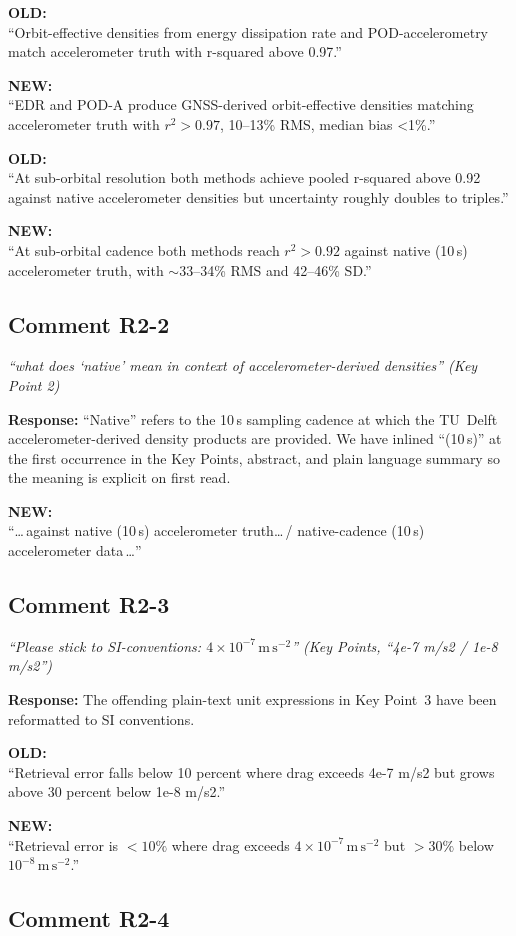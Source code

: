 \documentclass[11pt]{article}
\newcommand{\reviewercomment}[1]{%
  \medskip
  \noindent\textit{\color{reviewblue}#1}%
  \medskip
}
\newcommand{\oldtext}[1]{%
  \smallskip
  \noindent\hspace{1em}\begin{minipage}{0.92\textwidth}%
  \color{quotegray}\textbf{OLD:}\\[2pt]``#1''%
  \end{minipage}%
  \smallskip
}
\newcommand{\newtext}[1]{%
  \smallskip
  \noindent\hspace{1em}\begin{minipage}{0.92\textwidth}%
  \color{quotegreen}\textbf{NEW:}\\[2pt]``#1''%
  \end{minipage}%
  \smallskip
}
\begin{document}
\oldtext{Orbit-effective densities from energy dissipation rate and POD-accelerometry match accelerometer truth with r-squared above 0.97.}

\newtext{EDR and POD-A produce GNSS-derived orbit-effective densities matching accelerometer truth with $r^{2}>0.97$, 10--13\% RMS, median bias <1\%.}

\oldtext{At sub-orbital resolution both methods achieve pooled r-squared above 0.92 against native accelerometer densities but uncertainty roughly doubles to triples.}

\newtext{At sub-orbital cadence both methods reach $r^{2}>0.92$ against native (10\,s) accelerometer truth, with $\sim$33--34\% RMS and 42--46\% SD.}


\subsection{Comment R2-2}

\reviewercomment{%
``what does `native' mean in context of accelerometer-derived densities''
(Key Point 2)}

\textbf{Response:}
``Native'' refers to the 10\,s sampling cadence at which the TU~Delft
accelerometer-derived density products are provided. We have inlined
``(10\,s)'' at the first occurrence in the Key Points, abstract, and
plain language summary so the meaning is explicit on first read.

\newtext{\dots\,against native (10\,s) accelerometer truth\dots\,/ native-cadence (10\,s) accelerometer data\,\dots}


\subsection{Comment R2-3}

\reviewercomment{%
``Please stick to SI-conventions: $4 \times 10^{-7}\,\mathrm{m\,s^{-2}}$''
(Key Points, ``4e-7 m/s2 / 1e-8 m/s2'')}

\textbf{Response:}
The offending plain-text unit expressions in Key Point~3 have been
reformatted to SI conventions.

\oldtext{Retrieval error falls below 10 percent where drag exceeds 4e-7 m/s2 but grows above 30 percent below 1e-8 m/s2.}

\newtext{Retrieval error is $<10\%$ where drag exceeds $4 \times 10^{-7}\,\mathrm{m\,s^{-2}}$ but $>30\%$ below $10^{-8}\,\mathrm{m\,s^{-2}}$.}


\subsection{Comment R2-4}
\end{document}
